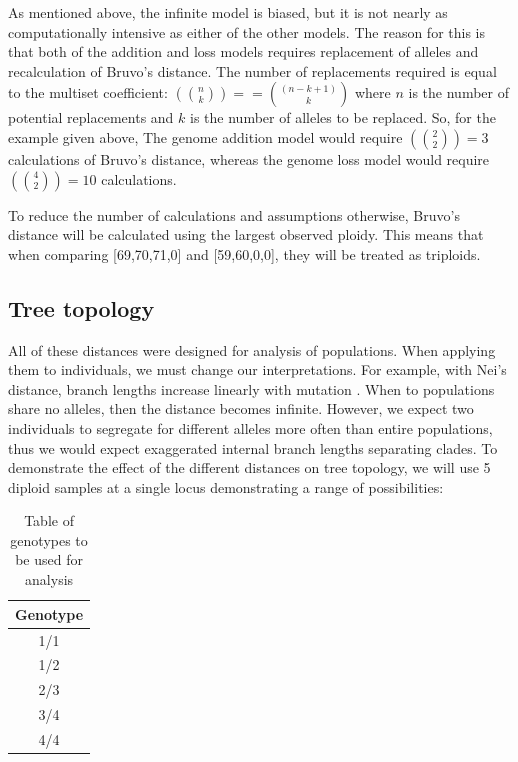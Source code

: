 \documentclass[letterpaper]{article}\usepackage[]{graphicx}\usepackage[]{color}
\begin{document}
As mentioned above, the infinite model is biased, but it is not nearly as
computationally intensive as either of the other models. The reason for this is
that both of the addition and loss models requires replacement of alleles and
recalculation of Bruvo's distance. The number of replacements required is equal
to the multiset coefficient: $\left({n \choose k}\right) == {(n-k+1) \choose k}$
where $n$ is the number of potential replacements and $k$ is the number of
alleles to be replaced. So, for the example given above, The genome addition
model would require $\left({2 \choose 2}\right) = 3$ calculations of Bruvo's
distance, whereas the genome loss model would require $\left({4 \choose
2}\right) = 10$ calculations.

To reduce the number of calculations and assumptions otherwise, Bruvo's distance
will be calculated using the largest observed ploidy. This means that when
comparing [69,70,71,0] and [59,60,0,0], they will be treated as triploids.

\subsection{Tree topology}

All of these distances were designed for analysis of populations. When applying
them to individuals, we must change our interpretations. For example, with Nei's
distance, branch lengths increase linearly with mutation
\cite{nei1972genetic,nei1978estimation}. When to populations share no alleles,
then the distance becomes infinite. However, we expect two individuals to
segregate for different alleles more often than entire populations, thus we
would expect exaggerated internal branch lengths separating clades. To
demonstrate the effect of the different distances on tree topology, we will use
5 diploid samples at a single locus demonstrating a range of possibilities:

\begin{table}[ht]
\centering
\begin{tabular}{c}
  \hline
Genotype \\ 
  \hline
1/1 \\ 
  1/2 \\ 
  2/3 \\ 
  3/4 \\ 
  4/4 \\ 
   \hline
\end{tabular}
\caption{Table of genotypes to be used for analysis} 
\end{table}
\end{document}
